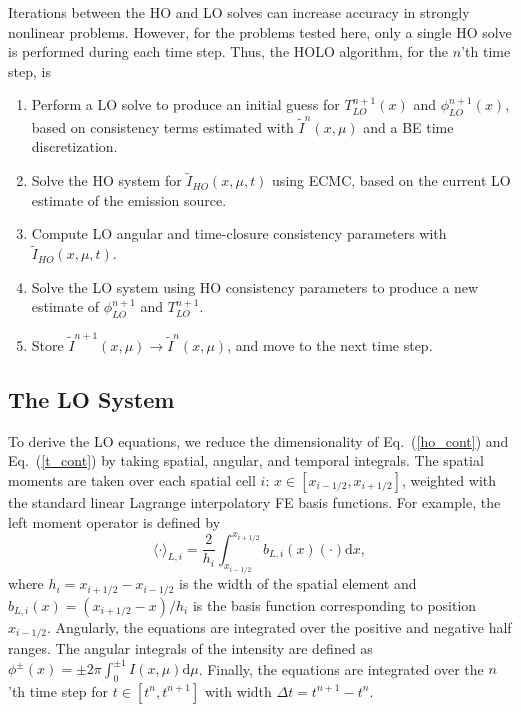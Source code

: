 \documentclass{anstrans}
\renewcommand{\eqref}[1]{(\ref{#1})}
\renewcommand{\d}{\mathrm{d}}
\newcommand{\mom}[1]{\langle #1 \rangle}
\newcommand{\xr}{{x_{i+1/2}}}
\begin{document}
Iterations between the HO and LO solves can increase accuracy in strongly nonlinear
problems. However, for the problems tested here, only a single HO solve is performed during each
time step.  Thus, the HOLO algorithm, for the $n$'th time step, is
\begin{enumerate}
    \item Perform a LO solve to produce an initial guess for $T_{LO}^{n+1}(x)$
        and $\phi_{LO}^{n+1}(x)$, based on consistency terms estimated with
        $\tilde{I}^{n}(x,\mu)$ and a BE time
    discretization.
\item Solve the HO system for $\tilde{I}_{HO}(x,\mu,t)$ using ECMC, based on the current
    LO estimate of the emission source.%
\item Compute LO angular and time-closure consistency parameters with
    $\tilde{I}_{HO}(x,\mu,t)$.  
\item Solve the LO system using HO consistency parameters to produce a new
    estimate of $\phi^{n+1}_{LO}$ and $T^{n+1}_{LO}$.
\item Store $\tilde{I}^{n+1}(x,\mu)\rightarrow\tilde{I}^{n}(x,\mu)$, and move to the next time step.
\end{enumerate}

\subsection*{The LO System}
\label{sec:lo}

To derive the LO equations, we reduce the dimensionality of Eq.~\eqref{ho_cont} and
Eq.~\eqref{t_cont} by taking spatial, angular, and
temporal integrals.  The spatial moments are taken over each spatial cell $i$:
$x\in[x_{i-1/2},x_{i+1/2}]$, weighted with the standard linear Lagrange interpolatory FE basis functions.  For example, the left moment operator is defined by
\begin{equation}\label{x_mom}
    \mom{\cdot}_{L,i} = \frac{2}{h_i} \int_{x_{i-1/2}}^{\xr} b_{L,i}(x) (\cdot) \d x,
\end{equation}
where $h_i=x_{i+1/2}-x_{i-1/2}$ is the width of the spatial element and
$b_{L,i}(x)=(x_{i+1/2}-x)/h_i$ is the basis function corresponding to position
$x_{i-1/2}$. Angularly, the equations are integrated over the positive and negative half
ranges.  The angular integrals of the intensity are defined as $\phi^\pm(x) = \pm2\pi
\int_0^{\pm 1} I(x,\mu) \d \mu$.  Finally, the equations are integrated over the $n$'th
time step for $t\in[t^n,t^{n+1}]$ with width $\Delta t = t^{n+1}-t^{n}$.  
\end{document}
